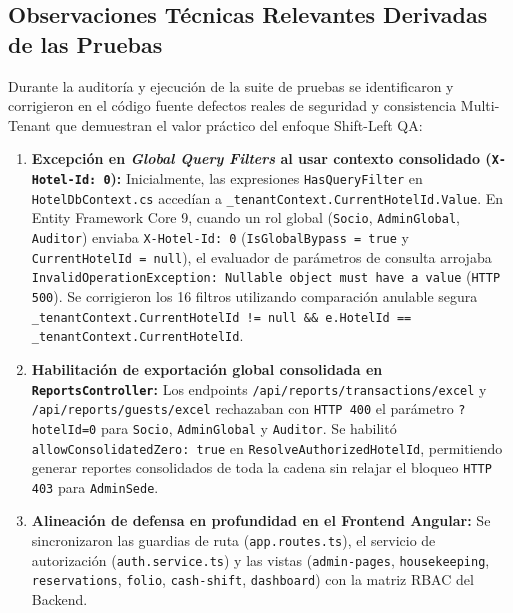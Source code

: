 \documentclass[12pt,a4paper]{article}
\begin{document}
\subsection{Observaciones T\'ecnicas Relevantes Derivadas de las Pruebas}
Durante la auditor\'ia y ejecuci\'on de la suite de pruebas se identificaron y corrigieron en el c\'odigo fuente defectos reales de seguridad y consistencia Multi-Tenant que demuestran el valor pr\'actico del enfoque Shift-Left QA:
\begin{enumerate}
    \item \textbf{Excepci\'on en \textit{Global Query Filters} al usar contexto consolidado (\texttt{X-Hotel-Id: 0}):} Inicialmente, las expresiones \texttt{HasQueryFilter} en \texttt{HotelDbContext.cs} acced\'ian a \texttt{\_tenantContext.CurrentHotelId.Value}. En Entity Framework Core 9, cuando un rol global (\texttt{Socio}, \texttt{AdminGlobal}, \texttt{Auditor}) enviaba \texttt{X-Hotel-Id: 0} (\texttt{IsGlobalBypass = true} y \texttt{CurrentHotelId = null}), el evaluador de par\'ametros de consulta arrojaba \texttt{InvalidOperationException: Nullable object must have a value} (\texttt{HTTP 500}). Se corrigieron los 16 filtros utilizando comparaci\'on anulable segura \texttt{\_tenantContext.CurrentHotelId != null \&\& e.HotelId == \_tenantContext.CurrentHotelId}.
    \item \textbf{Habilitaci\'on de exportaci\'on global consolidada en \texttt{ReportsController}:} Los endpoints \texttt{/api/reports/transactions/excel} y \texttt{/api/reports/guests/excel} rechazaban con \texttt{HTTP 400} el par\'ametro \texttt{?hotelId=0} para \texttt{Socio}, \texttt{AdminGlobal} y \texttt{Auditor}. Se habilit\'o \texttt{allowConsolidatedZero: true} en \texttt{ResolveAuthorizedHotelId}, permitiendo generar reportes consolidados de toda la cadena sin relajar el bloqueo \texttt{HTTP 403} para \texttt{AdminSede}.
    \item \textbf{Alineaci\'on de defensa en profundidad en el Frontend Angular:} Se sincronizaron las guardias de ruta (\texttt{app.routes.ts}), el servicio de autorizaci\'on (\texttt{auth.service.ts}) y las vistas (\texttt{admin-pages}, \texttt{housekeeping}, \texttt{reservations}, \texttt{folio}, \texttt{cash-shift}, \texttt{dashboard}) con la matriz RBAC del Backend.
\end{enumerate}
\end{document}
